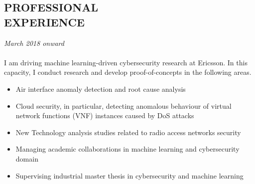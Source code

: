 \documentclass[margin, 10pt]{res} %
\begin{document}
\begin{resume}

\section{PROFESSIONAL \\ EXPERIENCE}

{\sl \textbf{}} \hfill \textit{March 2018 onward} \\
{\color{RubineRed}{Ericsson AB, Sweden}} \\
I am driving machine learning-driven cybersecurity research at Ericsson. In this capacity, I conduct research and develop proof-of-concepts in the following areas. 
\begin{itemize}
\item Air interface anomaly detection and root cause analysis 
\item Cloud security, in particular, detecting anomalous behaviour of virtual network functions (VNF) instances caused by DoS attacks 
\item New Technology analysis studies related to radio access networks security
\item Managing academic collaborations in machine learning and cybersecurity domain
\item Supervising industrial master thesis in cybersecurity and machine learning
\end{itemize}


\end{resume}
\end{document}
